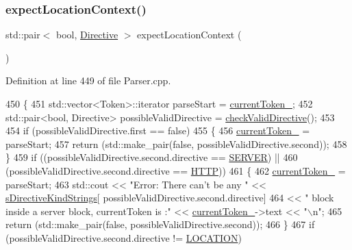 \subsubsection{\texorpdfstring{expect\+Location\+Context()}{expectLocationContext()}}
{\footnotesize\ttfamily std\+::pair$<$ bool, \hyperlink{classft_1_1_directive}{Directive} $>$ expect\+Location\+Context (\begin{DoxyParamCaption}{ }\end{DoxyParamCaption})\hspace{0.3cm}{\ttfamily [private]}}



Definition at line 449 of file Parser.\+cpp.


\begin{DoxyCode}
450     \{
451         std::vector<Token>::iterator parseStart = \hyperlink{classft_1_1_parser_a942c5b794d108f144c5b5028aaa34cb6}{currentToken\_};
452         std::pair<bool, Directive> possibleValidDirective = \hyperlink{classft_1_1_parser_ad48298d21629daf7c9a31e101bf322ba}{checkValidDirective}();
453 
454         \textcolor{keywordflow}{if} (possibleValidDirective.first == \textcolor{keyword}{false}) 
455         \{
456             \hyperlink{classft_1_1_parser_a942c5b794d108f144c5b5028aaa34cb6}{currentToken\_} = parseStart;
457             \textcolor{keywordflow}{return} (std::make\_pair(\textcolor{keyword}{false}, possibleValidDirective.second));
458         \}
459         \textcolor{keywordflow}{if} ((possibleValidDirective.second.directive == \hyperlink{namespaceft_a5a5554dff10f0dc50bae4cc5825ad75da67c96b24b23bcb408bae7626730a04b7}{SERVER}) || 
460             (possibleValidDirective.second.directive == \hyperlink{namespaceft_a5a5554dff10f0dc50bae4cc5825ad75da67e044074f46e6cea22788527da5f02e}{HTTP}))
461         \{
462             \hyperlink{classft_1_1_parser_a942c5b794d108f144c5b5028aaa34cb6}{currentToken\_} = parseStart;
463             std::cout << \textcolor{stringliteral}{"Error: There can't be any "} << \hyperlink{namespaceft_a2896a632198d516af93e4aea2d125f59}{sDirectiveKindStrings}[
      possibleValidDirective.second.directive] 
464                 << \textcolor{stringliteral}{" block inside a server block, currentToken is :"} << 
      \hyperlink{classft_1_1_parser_a942c5b794d108f144c5b5028aaa34cb6}{currentToken\_}->text << \textcolor{stringliteral}{"\(\backslash\)n"};
465             \textcolor{keywordflow}{return} (std::make\_pair(\textcolor{keyword}{false}, possibleValidDirective.second));
466         \}
467         \textcolor{keywordflow}{if} (possibleValidDirective.second.directive != \hyperlink{namespaceft_a5a5554dff10f0dc50bae4cc5825ad75da1e9e3944b93fde52c7c92e1e15dcaf4a}{LOCATION})

\end{DoxyCode}
